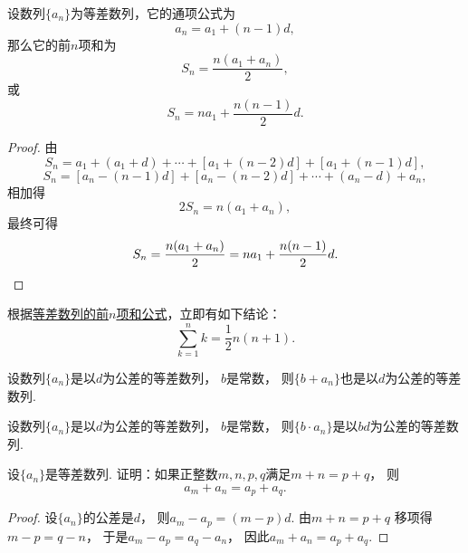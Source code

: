 \begin{property}[等差数列求和]
设数列\(\{a_n\}\)为等差数列，它的通项公式为\begin{equation*}
    a_n = a_1 + (n-1) d,
\end{equation*}
那么它的前\(n\)项和为\begin{equation}\label{equation:数列.等差数列的前n项和1}
    S_n = \frac{n(a_1 + a_n)}{2},
\end{equation}
或\begin{equation}\label{equation:数列.等差数列的前n项和2}
    S_n = n a_1 + \frac{n(n-1)}{2} d.
\end{equation}
\begin{proof}
由\begin{equation*}
    S_n = a_1 + (a_1 + d) + \dotsb + [a_1 + (n-2)d] + [a_1 + (n-1)d],
\end{equation*}\begin{equation*}
    S_n = [a_n - (n-1)d] + [a_n - (n-2)d] + \dotsb + (a_n - d) + a_n,
\end{equation*}相加得\begin{equation*}
    2 S_n = n(a_1 + a_n),
\end{equation*}最终可得\begin{equation*}
    S_n = \frac{n(a_1 + a_n)}{2} = n a_1 + \frac{n(n-1)}{2} d.
    \qedhere
\end{equation*}
\end{proof}
\end{property}

根据\hyperref[equation:数列.等差数列的前n项和1]{等差数列的前\(n\)项和公式}，立即有如下结论：
\begin{equation}
    \sum_{k=1}^n k = \frac{1}{2} n(n+1).
\end{equation}

\begin{property}
设数列\(\{a_n\}\)是以\(d\)为公差的等差数列，
\(b\)是常数，
则\(\{b + a_n\}\)也是以\(d\)为公差的等差数列.
\end{property}

\begin{property}
设数列\(\{a_n\}\)是以\(d\)为公差的等差数列，
\(b\)是常数，
则\(\{b \cdot a_n\}\)是以\(b d\)为公差的等差数列.
\end{property}

\begin{example}
设\(\{a_n\}\)是等差数列.
证明：如果正整数\(m,n,p,q\)满足\(m+n=p+q\)，
则\begin{equation*}
	a_m+a_n=a_p+a_q.
\end{equation*}
\begin{proof}
设\(\{a_n\}\)的公差是\(d\)，
则\(a_m-a_p = (m-p)d\).
由\(m+n=p+q\)
移项得\(m-p=q-n\)，
于是\(a_m-a_p = a_q-a_n\)，
因此\(a_m+a_n=a_p+a_q\).
\end{proof}
\end{example}

